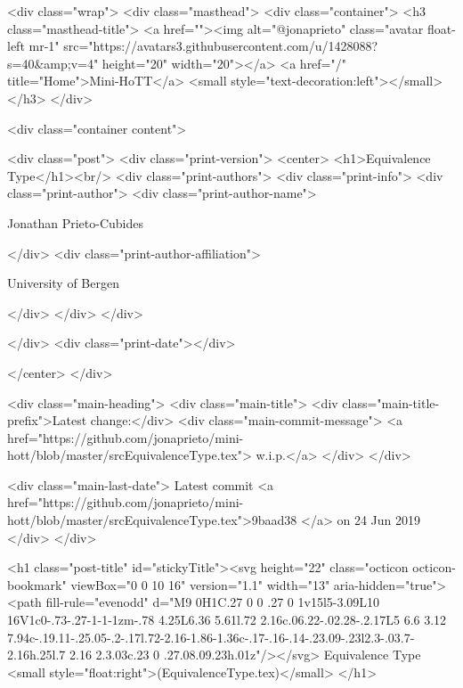     <div class="wrap">
      <div class="masthead">
        <div class="container">
          <h3 class="masthead-title">
            <a href=""><img alt="@jonaprieto" class="avatar float-left mr-1" src="https://avatars3.githubusercontent.com/u/1428088?s=40&amp;v=4" height="20" width="20"></a>
            <a href="/" title="Home">Mini-HoTT</a>
            <small style="text-decoration:left"></small>
          </h3>
        </div>
      
      <div class="container content">
        







<div class="post">
  <div class="print-version">
    <center>
      <h1>Equivalence Type</h1><br/>
        <div class="print-authors">
          <div class="print-info">
            <div class="print-author">
              <div class="print-author-name">
                
                  Jonathan Prieto-Cubides
                
              </div>
              <div class="print-author-affiliation">
                
                  University of Bergen
                
                </div>
            </div>
          </div>
          
          
        </div>
        <div class="print-date"></div>
        
        
    </center>
  </div>

  
  <div class="main-heading">
    <div class="main-title">
      <div class="main-title-prefix">Latest change:</div>
      <div class="main-commit-message">
            <a href="https://github.com/jonaprieto/mini-hott/blob/master/srcEquivalenceType.tex">
              w.i.p.</a>
      </div>
    </div>

    <div class="main-last-date">
      Latest commit <a href="https://github.com/jonaprieto/mini-hott/blob/master/srcEquivalenceType.tex">9baad38 </a> on  24 Jun 2019
    </div>
  </div>
  

  <h1 class="post-title" id="stickyTitle"><svg height="22" class="octicon octicon-bookmark" viewBox="0 0 10 16" version="1.1" width="13" aria-hidden="true"><path fill-rule="evenodd" d="M9 0H1C.27 0 0 .27 0 1v15l5-3.09L10 16V1c0-.73-.27-1-1-1zm-.78 4.25L6.36 5.61l.72 2.16c.06.22-.02.28-.2.17L5 6.6 3.12 7.94c-.19.11-.25.05-.2-.17l.72-2.16-1.86-1.36c-.17-.16-.14-.23.09-.23l2.3-.03.7-2.16h.25l.7 2.16 2.3.03c.23 0 .27.08.09.23h.01z"/></svg> Equivalence Type <small style="float:right">(EquivalenceType.tex)</small>
  </h1>

